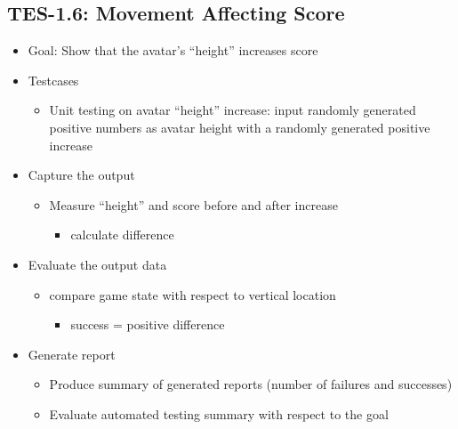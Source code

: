 \subsection{TES-1.6: Movement Affecting Score}
\begin{itemize}
\item Goal: Show that the avatar’s \textquotedblleft{}height\textquotedblright{} increases score

\item Testcases
\begin{itemize}
\item Unit testing on avatar “height” increase: input randomly generated positive numbers as avatar height with a randomly generated positive increase
\end{itemize}

\item Capture the output
\begin{itemize}
\item Measure “height” and score before and after increase
\begin{itemize}
\item calculate difference
\end{itemize}
\end{itemize}

\item Evaluate the output data
\begin{itemize}
\item compare game state with respect to vertical location
\begin{itemize}
\item success = positive difference
\end{itemize}
\end{itemize}

\item Generate report
\begin{itemize}
\item Produce summary of generated reports (number of failures and successes)
\item Evaluate automated testing summary with respect to the goal
\end{itemize}
\end{itemize}


